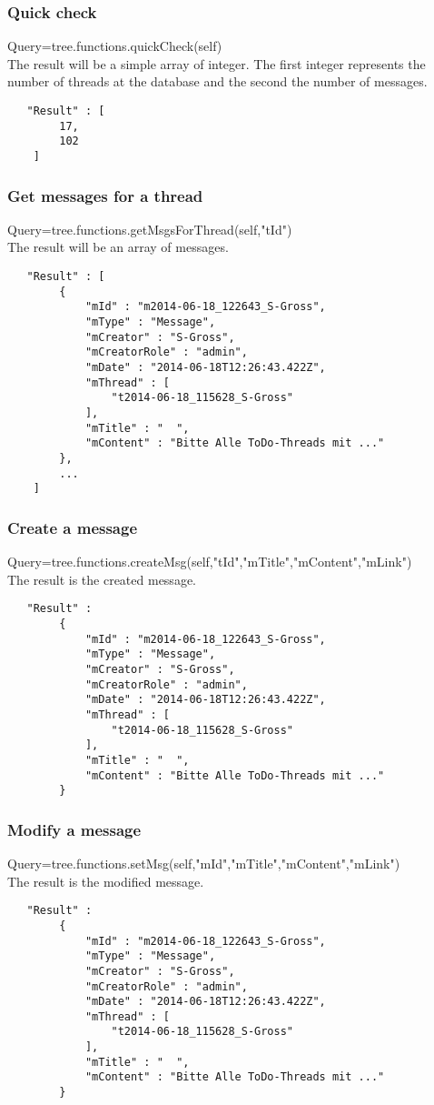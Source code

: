 \documentclass[12pt,a4paper,oneside]{report}
\begin{document}
\subsubsection{Quick check}
Query=tree.functions.quickCheck(self)\\
The result will be a simple array of integer. The first integer represents the number of threads at the database and the second the number of messages.

\begin{lstlisting}
   "Result" : [  
        17,
        102
    ]
\end{lstlisting}

\subsubsection{Get messages for a thread}
Query=tree.functions.getMsgsForThread(self,"tId")\\
The result will be an array of messages.
\begin{lstlisting}
   "Result" : [  
        { 
            "mId" : "m2014-06-18_122643_S-Gross",
            "mType" : "Message",
            "mCreator" : "S-Gross",
            "mCreatorRole" : "admin",
            "mDate" : "2014-06-18T12:26:43.422Z",
            "mThread" : [  
                "t2014-06-18_115628_S-Gross"
            ],
            "mTitle" : "  ",
            "mContent" : "Bitte Alle ToDo-Threads mit ..."
        },
        ...
    ]
\end{lstlisting}

\subsubsection{Create a message}
Query=tree.functions.createMsg(self,"tId","mTitle","mContent","mLink")\\
The result is the created message.
\begin{lstlisting}
   "Result" :   
        { 
            "mId" : "m2014-06-18_122643_S-Gross",
            "mType" : "Message",
            "mCreator" : "S-Gross",
            "mCreatorRole" : "admin",
            "mDate" : "2014-06-18T12:26:43.422Z",
            "mThread" : [  
                "t2014-06-18_115628_S-Gross"
            ],
            "mTitle" : "  ",
            "mContent" : "Bitte Alle ToDo-Threads mit ..."
        }
\end{lstlisting}

\subsubsection{Modify a message}
Query=tree.functions.setMsg(self,"mId","mTitle","mContent","mLink")\\
The result is the modified message.
\begin{lstlisting}
   "Result" :   
        { 
            "mId" : "m2014-06-18_122643_S-Gross",
            "mType" : "Message",
            "mCreator" : "S-Gross",
            "mCreatorRole" : "admin",
            "mDate" : "2014-06-18T12:26:43.422Z",
            "mThread" : [  
                "t2014-06-18_115628_S-Gross"
            ],
            "mTitle" : "  ",
            "mContent" : "Bitte Alle ToDo-Threads mit ..."
        }
\end{lstlisting}
\end{document}
